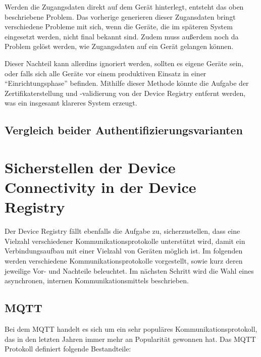 Werden die Zugangsdaten direkt auf dem Gerät hinterlegt, entsteht das oben beschriebene Problem. Das vorherige generieren dieser Zugansdaten bringt verschiedene Probleme mit sich, wenn die Geräte, die im späteren System eingesetzt werden, nicht final bekannt sind. Zudem muss außerdem noch da Problem gelöst werden, wie Zugangsdaten auf ein Gerät gelangen können.

Dieser Nachteil kann allerdins ignoriert werden, sollten es eigene Geräte sein, oder falls sich alle Geräte vor einem produktiven Einsatz in einer \enquote{Einrichtungsphase} befinden. Mithilfe dieser Methode könnte die Aufgabe der Zertifikaterstellung und -validierung von der Device Registry entfernt werden, was ein insgesamt klareres System erzeugt.

\subsection{Vergleich beider Authentifizierungsvarianten}

\section{Sicherstellen der Device Connectivity in der Device Registry}

Der Device Registry fällt ebenfalls die Aufgabe zu, sicherzustellen, dass eine Vielzahl verschiedener Kommunikationsprotokolle unterstützt wird, damit ein Verbindungsaufbau mit einer Vielzahl von Geräten möglich ist. Im folgenden werden verschiedene Kommunikationsprotokolle vorgestellt, sowie kurz deren jeweilige Vor- und Nachteile beleuchtet. Im nächsten Schritt wird die Wahl eines asynchronen, internen Kommunikationsmittels beschrieben.

\subsection{MQTT}
Bei dem \ac{MQTT} handelt es sich um ein sehr populäres Kommunikationsprotokoll, das in den letzten Jahren immer mehr an Popularität gewonnen hat. Das \ac{MQTT} Protokoll definiert folgende Bestandteile:

